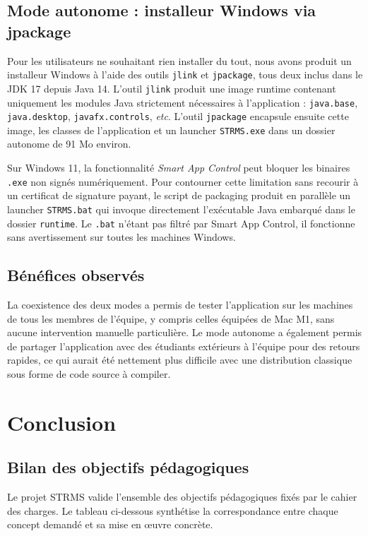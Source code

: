 \documentclass[11pt]{article}
\begin{document}
\subsection{Mode autonome : installeur Windows via jpackage}
Pour les utilisateurs ne souhaitant rien installer du tout, nous avons
produit un installeur Windows à l'aide des outils \texttt{jlink} et
\texttt{jpackage}, tous deux inclus dans le JDK 17 depuis Java 14.
L'outil \texttt{jlink} produit une image runtime contenant uniquement
les modules Java strictement nécessaires à l'application :
\texttt{java.base}, \texttt{java.desktop}, \texttt{javafx.controls},
\textit{etc}. L'outil \texttt{jpackage} encapsule ensuite cette image,
les classes de l'application et un launcher \texttt{STRMS.exe} dans un
dossier autonome de 91 Mo environ.

Sur Windows 11, la fonctionnalité \textit{Smart App Control} peut bloquer
les binaires \texttt{.exe} non signés numériquement. Pour contourner
cette limitation sans recourir à un certificat de signature payant, le
script de packaging produit en parallèle un launcher \texttt{STRMS.bat}
qui invoque directement l'exécutable Java embarqué dans le dossier
\texttt{runtime}. Le \texttt{.bat} n'étant pas filtré par Smart App
Control, il fonctionne sans avertissement sur toutes les machines
Windows.

\subsection{Bénéfices observés}
La coexistence des deux modes a permis de tester l'application sur les
machines de tous les membres de l'équipe, y compris celles équipées de
Mac M1, sans aucune intervention manuelle particulière. Le mode autonome
a également permis de partager l'application avec des étudiants
extérieurs à l'équipe pour des retours rapides, ce qui aurait été
nettement plus difficile avec une distribution classique sous forme de
code source à compiler.

\section{Conclusion}

\subsection{Bilan des objectifs pédagogiques}
Le projet STRMS valide l'ensemble des objectifs pédagogiques fixés par le
cahier des charges. Le tableau ci-dessous synthétise la correspondance
entre chaque concept demandé et sa mise en \oe uvre concrète.
\end{document}
